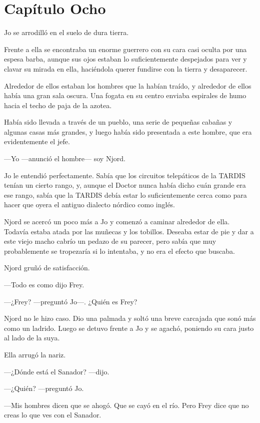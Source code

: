 \chapter*{Capítulo Ocho}

Jo se arrodilló en el suelo de dura tierra.

Frente a ella se encontraba un enorme guerrero con su cara casi oculta
por una espesa barba, aunque sus ojos estaban lo suficientemente
despejados para ver y clavar su mirada en ella, haciéndola querer
fundirse con la tierra y desaparecer.

Alrededor de ellos estaban los hombres que la habían traído, y alrededor
de ellos había una gran sala oscura. Una fogata en su centro enviaba
espirales de humo hacia el techo de paja de la azotea.

Había sido llevada a través de un pueblo, una serie de pequeñas cabañas
y algunas casas más grandes, y luego había sido presentada a este
hombre, que era evidentemente el jefe.

---Yo ---anunció el hombre--- soy Njord.

Jo le entendió perfectamente. Sabía que los circuitos telepáticos de la
TARDIS tenían un cierto rango, y, aunque el Doctor nunca había dicho
cuán grande era ese rango, sabía que la TARDIS debía estar lo
suficientemente cerca como para hacer que oyera el antiguo dialecto
nórdico como inglés.

Njord se acercó un poco más a Jo y comenzó a caminar alrededor de ella.
Todavía estaba atada por las muñecas y los tobillos. Deseaba estar de
pie y dar a este viejo macho cabrío un pedazo de su parecer, pero sabía
que muy probablemente se tropezaría si lo intentaba, y no era el efecto
que buscaba.

Njord gruñó de satisfacción.

---Todo es como dijo Frey.

---¿Frey? ---preguntó Jo---. ¿Quién es Frey?

Njord no le hizo caso. Dio una palmada y soltó una breve carcajada que
sonó más como un ladrido. Luego se detuvo frente a Jo y se agachó,
poniendo su cara justo al lado de la suya.

Ella arrugó la nariz.

---¿Dónde está el Sanador? ---dijo.

---¿Quién? ---preguntó Jo.

---Mis hombres dicen que se ahogó. Que se cayó en el río. Pero Frey dice
que no creas lo que ves con el Sanador.

